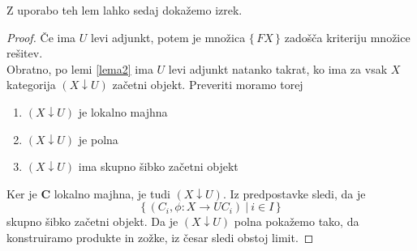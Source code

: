 \documentclass[12pt,a4paper]{book}
\theoremstyle{definition}
\theoremstyle{plain}
\theoremstyle{definition}
\theoremstyle{remark}
\newcommand{\cat}[1]{\textbf{#1}}
\renewcommand{\set}[1]{\{\,#1\,\}}
\begin{document}
Z uporabo teh lem lahko sedaj dokažemo izrek.
\begin{proof}
Če ima $U$ levi adjunkt, potem je množica $\set{FX}$ zadošča kriteriju množice rešitev.\\
Obratno, po lemi \ref{lema2} ima $U$ levi adjunkt natanko takrat, ko ima za vsak $X$ kategorija $(X \downarrow U)$ začetni objekt. Preveriti moramo torej
\begin{enumerate}
\item $(X \downarrow U)$ je lokalno majhna
\item $(X \downarrow U)$ je polna 
\item $(X \downarrow U)$ ima skupno šibko začetni objekt
\end{enumerate}
Ker je $\cat{C}$ lokalno majhna, je tudi $(X \downarrow U)$. Iz predpostavke sledi, da je
$$\set{(C_i, \phi : X \to UC_i) \ \vert \ i \in I}$$
skupno šibko začetni objekt. Da je $(X \downarrow U)$ polna pokažemo tako, da konstruiramo produkte in zožke, iz česar sledi obstoj limit. 
\end{proof}
%
\end{document}
